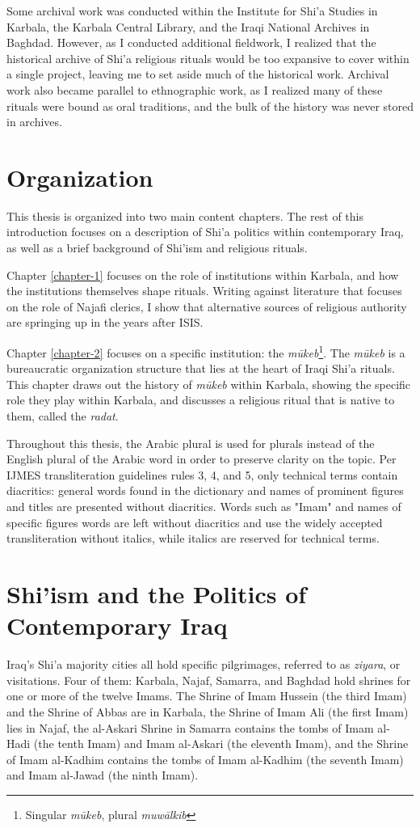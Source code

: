 Some archival work was conducted within the Institute for Shi'a Studies in Karbala, the Karbala Central Library, and the Iraqi National Archives in Baghdad. However, as I conducted additional fieldwork, I realized that the historical archive of Shi'a religious rituals would be too expansive to cover within a single project, leaving me to set aside much of the historical work. Archival work also became parallel to ethnographic work, as I realized many of these rituals were bound as oral traditions, and the bulk of the history was never stored in archives. 

\section{Organization}

This thesis is organized into two main content chapters. The rest of this introduction focuses on a description of Shi'a politics within contemporary Iraq, as well as a brief background of Shi'ism and religious rituals.

Chapter \ref{chapter-1} focuses on the role of institutions within Karbala, and how the institutions themselves shape rituals. Writing against literature that focuses on the role of Najafi clerics, I show that alternative sources of religious authority are springing up in the years after ISIS.

Chapter \ref{chapter-2} focuses on a specific institution: the \emph{mūkeb}\footnote{Singular \emph{mūkeb}, plural \emph{muwālkib}}. The \emph{mūkeb} is a bureaucratic organization structure that lies at the heart of Iraqi Shi'a rituals. This chapter draws out the history of \emph{mūkeb} within Karbala, showing the specific role they play within Karbala, and discusses a religious ritual that is native to them, called the \emph{radat}.

Throughout this thesis, the Arabic plural is used for plurals instead of the English plural of the Arabic word in order to preserve clarity on the topic. Per IJMES transliteration guidelines rules 3, 4, and 5, only technical terms contain diacritics: general words found in the dictionary and names of prominent figures and titles are presented without diacritics. Words such as "Imam" and names of specific figures words are left without diacritics and use the widely accepted transliteration without italics, while italics are reserved for technical terms.

\section{Shi'ism and the Politics of Contemporary Iraq}
Iraq's Shi'a majority cities all hold specific pilgrimages, referred to as \emph{ziyara}, or visitations. Four of them: Karbala, Najaf, Samarra, and Baghdad hold shrines for one or more of the twelve Imams. The Shrine of Imam Hussein (the third Imam) and the Shrine of Abbas are in Karbala, the Shrine of Imam Ali (the first Imam) lies in Najaf, the al-Askari Shrine in Samarra contains the tombs of Imam al-Hadi (the tenth Imam) and Imam al-Askari (the eleventh Imam), and the Shrine of Imam al-Kadhim contains the tombs of Imam al-Kadhim (the seventh Imam) and Imam al-Jawad (the ninth Imam). 

